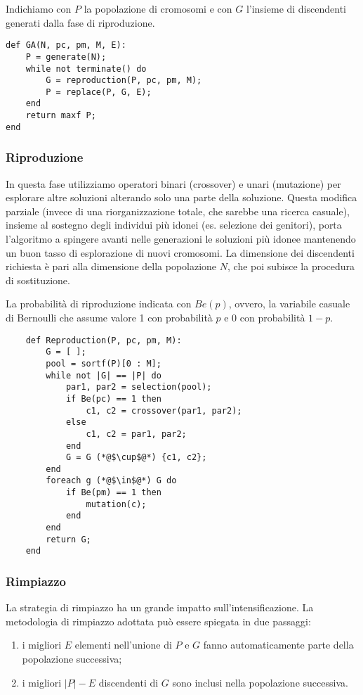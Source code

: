 Indichiamo con $P$ la popolazione di cromosomi e con $G$ l'insieme di discendenti generati dalla fase di riproduzione.

\begin{lstlisting}
def GA(N, pc, pm, M, E):
    P = generate(N);
    while not terminate() do
        G = reproduction(P, pc, pm, M);
        P = replace(P, G, E);
    end
    return maxf P;
end
\end{lstlisting}

\subsubsection{Riproduzione}
In questa fase utilizziamo operatori binari (crossover) e unari (mutazione) per esplorare altre soluzioni alterando solo una parte della soluzione. Questa modifica parziale (invece di una riorganizzazione totale, che sarebbe una ricerca casuale), insieme al sostegno degli individui più idonei (es. selezione dei genitori), porta l'algoritmo a spingere avanti nelle generazioni le soluzioni più idonee mantenendo un buon tasso di esplorazione di nuovi cromosomi. La dimensione dei discendenti richiesta è pari alla dimensione della popolazione $N$, che poi subisce la procedura di sostituzione.

La probabilità di riproduzione indicata con $Be(p)$, ovvero, la variabile casuale di Bernoulli che assume valore 1 con probabilità $p$ e 0 con probabilità $1-p$.

\begin{lstlisting}
    def Reproduction(P, pc, pm, M):
        G = [ ];
        pool = sortf(P)[0 : M];
        while not |G| == |P| do
            par1, par2 = selection(pool);
            if Be(pc) == 1 then
                c1, c2 = crossover(par1, par2);
            else
                c1, c2 = par1, par2;
            end
            G = G (*@$\cup$@*) {c1, c2};
        end
        foreach g (*@$\in$@*) G do
            if Be(pm) == 1 then
                mutation(c);
            end
        end
        return G;
    end
\end{lstlisting}

\subsubsection{Rimpiazzo}
La strategia di rimpiazzo ha un grande impatto sull'intensificazione. La metodologia di rimpiazzo adottata può essere spiegata in due passaggi: 
\begin{enumerate}
    \item i migliori $E$ elementi nell'unione di $P$ e $G$ fanno automaticamente parte della popolazione successiva;
    \item i migliori $|P| - E$ discendenti di $G$ sono inclusi nella popolazione successiva.
\end{enumerate}

